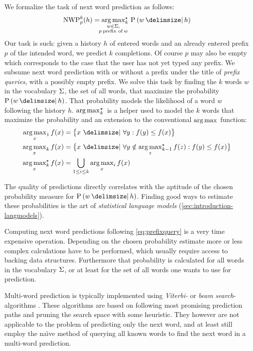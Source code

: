 We formalize the task of next word prediction as follows:
\begin{equation}
  \label{eq:prefixquery}
  \NWP[p][k]{h} =
    \Argmax*[k]{\mathclap{\substack{w \in \Vocab,\\p \: \text{prefix of} \: w}}}
      \Prob{w}{h}
\end{equation}
Our task is such: given a history $h$ of entered words and an already entered
prefix $p$ of the intended word, we predict $k$ completions.
Of course $p$ may also be empty which corresponds to the case that the user has
not yet typed any prefix.
We subsume next word prediction with or without a prefix under the title of
\emph{prefix queries}, with a possibly empty prefix.
We solve this task by finding the $k$ words $w$ in the vocabulary $\Sigma$, the
set of all words, that maximize the probability $\Prob{w}{h}$.
That probability models the likelihood of a word $w$ following the history $h$.
$\Argmax*[k]$ is a helper used to model the $k$ words that maximize the
probability and an extension to the conventional $\Argmax$ function:
\begin{subequations}
  \begin{align}
    \Argmax [1]{x} f(x) &= \big\{ x \,\Given\, \forall y : f(y) \leq f(x) \big\} \\
    \Argmax [k]{x} f(x) &= \big\{ x \,\Given\, \forall y \notin \Argmax*[k-1]{z} f(z) : f(y) \leq f(x) \big\} \\
    \Argmax*[k]{x} f(x) &= \bigcup_{{1 \leq i \leq k}} \Argmax[i]{x} f(x)
  \end{align}
\end{subequations}

The quality of predictions directly correlates with the aptitude of the chosen
probability measure for $\Prob{w}{h}$.
Finding good ways to estimate these probabilities is the art of
\emph{statistical language models} (\cref{sec:introduction-langmodels}).

Computing next word predictions following \cref{eq:prefixquery} is a very time
expensive operation.
Depending on the chosen probability estimate more or less complex calculations
have to be performed, which usually require access to backing data structures.
Furthermore that probability is calculated for all words in the vocabulary
$\Sigma$, or at least for the set of all words one wants to use for prediction.

Multi-word prediction is typically implemented using \emph{Viterbi-} or
\emph{beam search}-algorithms \parencite{Bickel2005,JurafskyMartin2009}.
These algorithms are based on following most promising prediction paths and
pruning the search space with some heuristic.
They however are not applicable to the problem of predicting only the next
word, and at least \textcite{Bickel2005} still employ the na\"{\i}ve method of
querying all known words to find the next word in a multi-word prediction.

